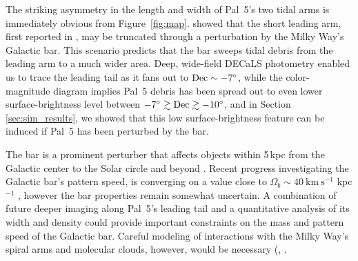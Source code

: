 \documentclass[twocolumn]{aastex62}
\newcommand{\kms}{\ensuremath{\textrm{km}~\textrm{s}^{-1}}}
\begin{document}
The striking asymmetry in the length and width of Pal~5's two tidal arms is immediately obvious from Figure~\ref{fig:map}.
\citet{Pearson:2017} showed that the short leading arm, first reported in \citet{Bernard:2016}, may be truncated through a perturbation by the Milky Way's Galactic bar. 
This scenario predicts that the bar sweeps tidal debris from the leading arm to a much wider area. 
Deep, wide-field DECaLS photometry enabled us to trace the leading tail as it fans out to $\rm Dec\sim-7^\circ$, while the color-magnitude diagram implies Pal~5 debris has been spread out to even lower surface-brightness level between $-7^\circ\gtrsim\rm Dec\gtrsim-10^\circ$, and in Section \ref{sec:sim_results}, we showed that this low surface-brightness feature can be induced if Pal~5 has been perturbed by the bar. 

The bar is a prominent perturber that affects objects within 5\,kpc from the Galactic center \citep[e.g., the Ophiuchus stream,][]{Price-Whelan:2016b, Hattori:2016} to the Solar circle and beyond \citep[e.g., local phase-space overdensities][]{Hunt:2018, Monari:2019}.
Recent progress investigating the Galactic bar's pattern speed, is converging on a value close to $\Omega_b \sim 40 ~\kms$ kpc$^{-1}$ \citep[e.g.,][]{Clarke:2019, Sanders:2019, Bovy:2019}, however the bar properties remain somewhat uncertain. A combination of future deeper imaging along Pal~5's leading tail and a quantitative analysis of its width and density could provide important constraints on the mass and pattern speed of the Galactic bar. Careful modeling of interactions with the Milky Way's spiral arms and molecular clouds, however, would be necessary (\citealt{Banik:2019}, \citealt{Amorisco:2016}. 
\end{document}
